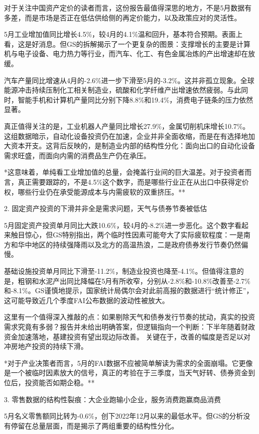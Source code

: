 \documentclass[11pt]{ctexart}
\begin{document}
对于关注中国资产定价的读者而言，这份报告最值得深思的地方，不是5月数据有多差，而是市场是否正在低估供给侧的再定价能力，以及政策应对的灵活性。

5月工业增加值同比增长4.5\%，较4月的4.1\%温和回升，基本符合预期。表面上看，这是好消息。但GS的拆解揭示了一个更复杂的图景：支撑增长的主要是计算机与电子设备、电力热力等行业，而汽车、化工、有色金属冶炼的产出增速却在放缓。

汽车产量同比增速从4月的-2.6\%进一步下滑至5月的-3.2\%。这并非孤立现象。全球能源冲击持续压制化工相关制造业，硫酸和化学纤维产出增速依然疲弱。与此同时，智能手机和计算机产量同比分别下降8.8\%和19.4\%，消费电子链条的压力依然显著。

真正值得关注的是，工业机器人产量同比增长27.9\%，金属切削机床增长10.7\%。这组数据暗示，自动化设备投资仍在加速，企业并非全面收缩，而是在有选择地加大资本开支。这背后反映的，是制造业内部的结构性分化：面向出口的自动化设备需求旺盛，而面向内需的消费品生产仍在承压。

*这意味着，单纯看工业增加值的总量，会掩盖行业间的巨大温差。对于投资者而言，真正需要跟踪的，不是4.5\%这个数字，而是哪些行业正在从出口中获得定价权，哪些行业仍在承受能源成本与内需疲软的双重挤压。**

2. 固定资产投资的下滑并非全是需求问题，天气与债券节奏被低估

5月固定资产投资单月同比大跌10.6\%，较4月的-8.2\%进一步恶化。这个数字看起来触目惊心，但GS特别指出，两个临时性因素可能夸大了实际疲软程度：一是南方和华中地区的持续强降雨以及北方的高温热浪，二是政府债券发行节奏仍然偏慢。

基础设施投资单月同比下滑至-11.2\%，制造业投资也降至-4.1\%。但值得注意的是，粗钢和水泥产出同比降幅在5月有所收窄，分别从-2.8\%和-10.8\%改善至-2.7\%和-8.1\%。GS谨慎地提示，国家统计局偶尔会对此前高报的数据进行“统计修正”，这可能导致近几个季度FAI公布数据的波动性被放大。

这里有一个值得深入推敲的点：如果剔除天气和债券发行节奏的扰动，真实的投资需求究竟有多弱？报告并未给出明确答案，但逻辑指向一个判断：下半年随着财政资金加速落地，基建投资有望出现边际改善。 关键在于，改善的幅度是否足以对冲房地产投资的持续下滑。

*对于产业决策者而言，5月的FAI数据不应被简单解读为需求的全面崩塌。它更像是一个被临时因素放大的信号，真正的考验在于三季度，当天气好转、债券资金到位后，投资能否如期企稳。**

3. 零售数据的结构性裂痕：大企业跑输小企业，服务消费跑赢商品消费

5月名义零售额同比转为-0.6\%，创下2022年12月以来的最低水平。但GS的分析没有停留在总量层面，而是揭示了两组重要的结构性分化。
\end{document}
